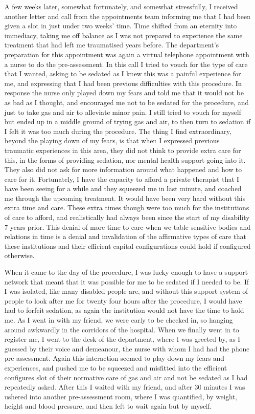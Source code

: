 A few weeks later, somewhat fortunately, and somewhat stressfully, I
received another letter and call from the appointments team informing me
that I had been given a slot in just under two weeks' time. Time shifted
from an eternity into immediacy, taking me off balance as I was not
prepared to experience the same treatment that had left me traumatised
years before. The department's preparation for this appointment was
again a virtual telephone appointment with a nurse to do the
pre-assessment. In this call I tried to vouch for the type of care that
I wanted, asking to be sedated as I knew this was a painful experience
for me, and expressing that I had been previous difficulties with this
procedure. In response the nurse only played down my fears and told me
that it would not be as bad as I thought, and encouraged me not to be
sedated for the procedure, and just to take gas and air to alleviate
minor pain. I still tried to vouch for myself but ended up in a middle
ground of trying gas and air, to then turn to sedation if I felt it was
too much during the procedure. The thing I find extraordinary, beyond
the playing down of my fears, is that when I expressed previous
traumatic experiences in this area, they did not think to provide extra
care for this, in the forms of providing sedation, nor mental health
support going into it. They also did not ask for more information around
what happened and how to care for it. Fortunately, I have the capacity
to afford a private therapist that I have been seeing for a while and
they squeezed me in last minute, and coached me through the upcoming
treatment. It would have been very hard without this extra time and
care. These extra times though were too much for the institutions of
care to afford, and realistically had always been since the start of my
disability 7 years prior. This denial of more time to care when we table
sensitive bodies and relations in time is a denial and invalidation of
the affirmative types of care that these institutions and their
efficient capital configurations could hold if configured otherwise.

When it came to the day of the procedure, I was lucky enough to have a
support network that meant that it was possible for me to be sedated if
I needed to be. If I was isolated, like many disabled people are, and
without this support system of people to look after me for twenty four
hours after the procedure, I would have had to forfeit sedation, as
again the institution would not have the time to hold me. As I went in
with my friend, we were early to be checked in, so hanging around
awkwardly in the corridors of the hospital. When we finally went in to
register me, I went to the desk of the department, where I was greeted
by, as I guessed by their voice and demeanour, the nurse with whom I had
had the phone pre-assessment. Again this interaction seemed to play down
my fears and experiences, and pushed me to be squeezed and misfitted
into the efficient configures slot of their normative care of gas and
air and not be sedated as I had repeatedly asked. After this I waited
with my friend, and after 30 minutes I was ushered into another
pre-assessment room, where I was quantified, by weight, height and blood
pressure, and then left to wait again but by myself.

